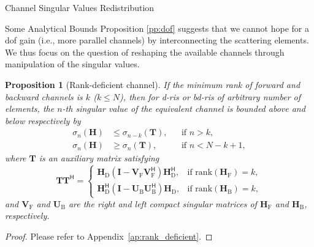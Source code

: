 \documentclass[journal]{IEEEtran}
\newtheorem{proposition}{Proposition}
\begin{document}
\begin{section}{Channel Singular Values Redistribution}
\begin{subsection}{Some Analytical Bounds}
		Proposition \ref{pp:dof} suggests that we cannot hope for a \gls{dof} gain (i.e., more parallel channels) by interconnecting the scattering elements.
		We thus focus on the question of reshaping the available channels through manipulation of the singular values.


		\begin{proposition}[Rank-deficient channel]\label{pp:rank_deficient}
			If the minimum rank of forward and backward channels is $k$ ($k \le N$),
			then for \gls{d}-\gls{ris} or \gls{bd}-\gls{ris} of arbitrary number of elements, the $n$-th singular value of the equivalent channel is bounded above and below respectively by
			\begin{subequations}
				\begin{align}
					\sigma_n(\mathbf{H}) & \le \sigma_{n-k}(\mathbf{T}), &  & \text{if } n > k, \label{iq:sv_bound_enlarge}          \\
					\sigma_n(\mathbf{H}) & \ge \sigma_n(\mathbf{T}),     &  & \text{if } n < N - k + 1, \label{iq:sv_bound_suppress}
				\end{align}
				\label{iq:sv_bound_rank_deficient}
			\end{subequations}
			where $\mathbf{T}$ is an auxiliary matrix satisfying
			\begin{equation}
				\mathbf{T} \mathbf{T}^\mathsf{H} =
				\begin{cases}
					\mathbf{H}_\mathrm{D} (\mathbf{I} - \mathbf{V}_\mathrm{F} \mathbf{V}_\mathrm{F}^\mathsf{H}) \mathbf{H}_\mathrm{D}^\mathsf{H}, & \text{if } \mathrm{rank}(\mathbf{H}_\mathrm{F}) = k, \\
					\mathbf{H}_\mathrm{D}^\mathsf{H} (\mathbf{I} - \mathbf{U}_\mathrm{B} \mathbf{U}_\mathrm{B}^\mathsf{H}) \mathbf{H}_\mathrm{D}, & \text{if } \mathrm{rank}(\mathbf{H}_\mathrm{B}) = k,
				\end{cases}
				\label{eq:auxiliary_matrix}
			\end{equation}
			and $\mathbf{V}_\mathrm{F}$ and $\mathbf{U}_\mathrm{B}$ are the right and left compact singular matrices of $\mathbf{H}_\mathrm{F}$ and $\mathbf{H}_\mathrm{B}$, respectively.
		\end{proposition}
		\begin{proof}
			Please refer to Appendix~\ref{ap:rank_deficient}.
		\end{proof}


\end{subsection}
\end{section}
\end{document}
